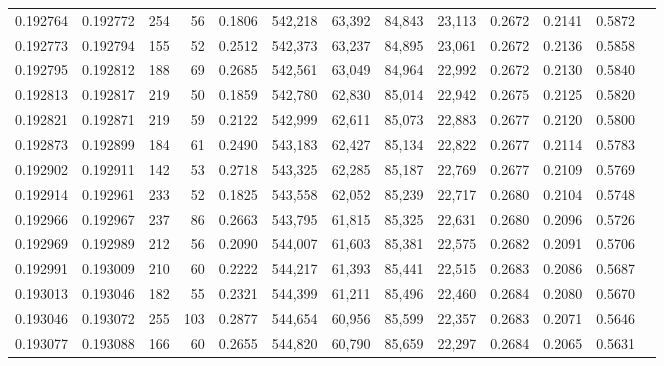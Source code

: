 \begin{tabular}{rrrrrrrrrrrrr}
0.192764 & 0.192772 &   254 &  56 &                                     0.1806 & 542,218 &  63,392 &  84,843 &  23,113 & 0.2672 & 0.2141 & 0.5872 \\
0.192773 & 0.192794 &   155 &  52 &                                     0.2512 & 542,373 &  63,237 &  84,895 &  23,061 & 0.2672 & 0.2136 & 0.5858 \\
0.192795 & 0.192812 &   188 &  69 &                                     0.2685 & 542,561 &  63,049 &  84,964 &  22,992 & 0.2672 & 0.2130 & 0.5840 \\
0.192813 & 0.192817 &   219 &  50 &                                     0.1859 & 542,780 &  62,830 &  85,014 &  22,942 & 0.2675 & 0.2125 & 0.5820 \\
0.192821 & 0.192871 &   219 &  59 &                                     0.2122 & 542,999 &  62,611 &  85,073 &  22,883 & 0.2677 & 0.2120 & 0.5800 \\
0.192873 & 0.192899 &   184 &  61 &                                     0.2490 & 543,183 &  62,427 &  85,134 &  22,822 & 0.2677 & 0.2114 & 0.5783 \\
0.192902 & 0.192911 &   142 &  53 &                                     0.2718 & 543,325 &  62,285 &  85,187 &  22,769 & 0.2677 & 0.2109 & 0.5769 \\
0.192914 & 0.192961 &   233 &  52 &                                     0.1825 & 543,558 &  62,052 &  85,239 &  22,717 & 0.2680 & 0.2104 & 0.5748 \\
0.192966 & 0.192967 &   237 &  86 &                                     0.2663 & 543,795 &  61,815 &  85,325 &  22,631 & 0.2680 & 0.2096 & 0.5726 \\
0.192969 & 0.192989 &   212 &  56 &                                     0.2090 & 544,007 &  61,603 &  85,381 &  22,575 & 0.2682 & 0.2091 & 0.5706 \\
0.192991 & 0.193009 &   210 &  60 &                                     0.2222 & 544,217 &  61,393 &  85,441 &  22,515 & 0.2683 & 0.2086 & 0.5687 \\
0.193013 & 0.193046 &   182 &  55 &                                     0.2321 & 544,399 &  61,211 &  85,496 &  22,460 & 0.2684 & 0.2080 & 0.5670 \\
0.193046 & 0.193072 &   255 & 103 &                                     0.2877 & 544,654 &  60,956 &  85,599 &  22,357 & 0.2683 & 0.2071 & 0.5646 \\
0.193077 & 0.193088 &   166 &  60 &                                     0.2655 & 544,820 &  60,790 &  85,659 &  22,297 & 0.2684 & 0.2065 & 0.5631 \\

\end{tabular}
